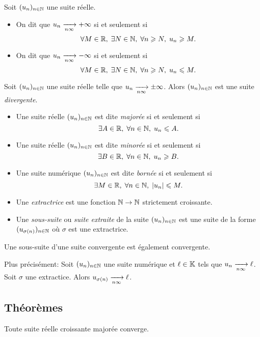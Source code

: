 \documentclass{yann}
\newcommand\U{(u_n)_{n\in\N}}
\begin{document}
Soit $\U$ une suite réelle.
\begin{itemize}
\item
On dit que \emph{$u_n \xrightarrow[{n\infty}]{} +\infty$} si et seulement si
  \[ \forall M\in\mathbb{R},\;\exists N\in\mathbb{N},\;\forall n\geqslant N,\; u_n\geqslant M. \]
\item
On dit que \emph{$u_n \xrightarrow[{n\infty}]{} -\infty$} si et seulement si
  \[ \forall M\in\mathbb{R},\;\exists N\in\mathbb{N},\;\forall n\geqslant N,\; u_n\leqslant M. \]
\end{itemize}


Soit $\U$ une suite réelle telle que $u_n \xrightarrow[{n\infty}]{}\pm\infty$.
Alors $\U$ est une suite \emph{divergente}.

\begin{itemize}
\item
Une suite réelle $\U$ est dite \emph{majorée} si et seulement si
  \[ \exists A\in\mathbb{R},\;\forall n\in\mathbb{N},\; u_n\leqslant A. \]
\item
Une suite réelle $\U$ est dite \emph{minorée} si et seulement si
  \[ \exists B\in\mathbb{R},\;\forall n\in\mathbb{N},\; u_n\geqslant B. \]
\item
Une suite numérique $\U$ est dite \emph{bornée} si et seulement si
  \[ \exists M\in\mathbb{R},\;\forall n\in\mathbb{N},\; \left|{u_n}\right|\leqslant M. \]
\end{itemize}

\begin{itemize}
\item
Une \emph{extractrice} est une fonction $\mathbb{N}\to\mathbb{N}$ strictement croissante.
\item
Une \emph{sous-suite} ou \emph{suite extraite} de la suite $\U$
  est une suite de la forme $(u_{\sigma(n)})_{n\in\mathbb{N}}$ où $\sigma$
  est une extractrice.
\end{itemize}


Une sous-suite d'une suite convergente est également convergente.

Plus précisément:
Soit $\U$ une suite numérique et $\ell\in\mathbb{K}$ tels que $u_n \xrightarrow[{n\infty}]{}\ell$.
Soit $\sigma$ une extractice.
Alors $u_{\sigma(n)} \xrightarrow[{n\infty}]{}\ell$.

\subsection{Théorèmes}


Toute suite réelle croissante majorée converge.
\end{document}

